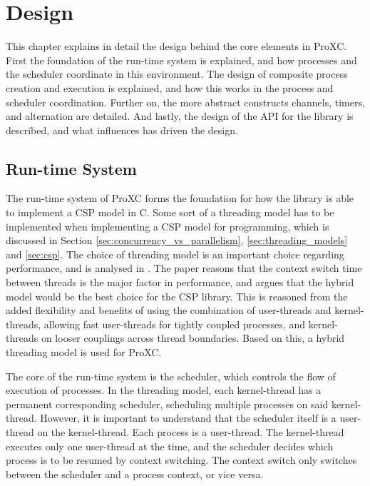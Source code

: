 
\chapter{Design}
\label{ch:design}

This chapter explains in detail the design behind the core elements in ProXC. First the foundation of the run\hyp{}time system is explained, and how processes and the scheduler coordinate in this environment. The design of composite process creation and execution is explained, and how this works in the process and scheduler coordination. Further on, the more abstract constructs channels, timers, and alternation are detailed. And lastly, the design of the API for the library is described, and what influences has driven the design. 


\section{Run\hyp{}time System}
\label{sec:runtime_system}

The run\hyp{}time system of ProXC forms the foundation for how the library is able to implement a CSP model in C. Some sort of a threading model has to be implemented when implementing a CSP model for programming, which is discussed in Section \ref{sec:concurrency_vs_parallelism}, \ref{sec:threading_models} and \ref{sec:csp}. The choice of threading model is an important choice regarding performance, and is analysed in \citet[chapter 1]{c++csp2}. The paper reasons that the context switch time between threads is the major factor in performance, and argues that the hybrid model would be the best choice for the CSP library. This is reasoned from the added flexibility and benefits of using the combination of user\hyp{}threads and kernel\hyp{}threads, allowing fast user\hyp{}threads for tightly coupled processes, and kernel\hyp{}threads on looser couplings across thread boundaries. Based on this, a hybrid threading model is used for ProXC. 

The core of the run\hyp{}time system is the scheduler, which controls the flow of execution of processes. In the threading model, each kernel\hyp{}thread has a permanent corresponding scheduler, scheduling multiple processes on said kernel\hyp{}thread. However, it is important to understand that the scheduler itself is a user\hyp{}thread on the kernel\hyp{}thread. Each process is a user\hyp{}thread. The kernel\hyp{}thread executes only one user\hyp{}thread at the time, and the scheduler decides which process is to be resumed by context switching. The context switch only switches between the scheduler and a process context, or vice versa. 

